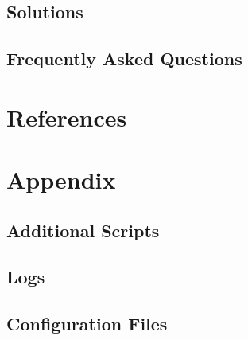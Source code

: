 \documentclass[12pt,a4paper]{report}
\begin{document}
\section{Solutions}
\section{Frequently Asked Questions}

\chapter{References}

\chapter{Appendix}
\section{Additional Scripts}
\section{Logs}
\section{Configuration Files}
\end{document}
